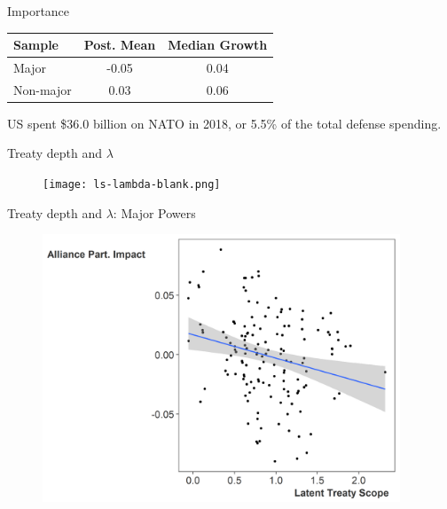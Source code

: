 \documentclass[12pt]{beamer}
\begin{document}

\begin{frame}[standout]{Importance} 

\begin{tabular}{lcc}
Sample & Post. Mean & Median Growth \\
\hline
Major & -0.05 & 0.04 \\
\pause
Non-major & 0.03 & 0.06  \\
\end{tabular}

\pause

US spent \$36.0 billion on NATO in 2018, or 5.5\% of the total defense spending. 


\end{frame}



\begin{frame}{Treaty depth and $\lambda$}

\begin{figure}[htbp]
	\centering
		\texttt{[image: ls-lambda-blank.png]}
	\label{fig:ls-lambda-blank}
\end{figure}


\end{frame}



\begin{frame}{Treaty depth and $\lambda$: Major Powers}

\begin{figure}[htbp]
	\centering
		\includegraphics[width=0.95\textwidth]{ls-lambda-maj.png}
	\label{fig:ls-lambda-maj}
\end{figure}


\end{frame}
\end{document}
